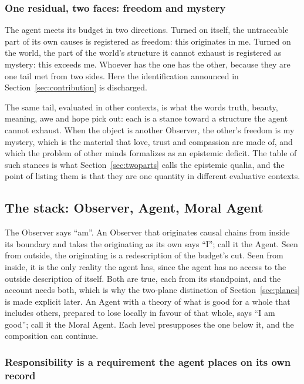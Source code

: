 \subsubsection{One residual, two faces: freedom and mystery}
\label{sec:twofaces}

The agent meets its budget in two directions. Turned on itself, the untraceable part of its own causes
is registered as freedom: this originates in me. Turned on the world, the part of the world's structure
it cannot exhaust is registered as mystery: this exceeds me. Whoever has the one has the other, because
they are one tail met from two sides. Here the identification announced in Section~\ref{sec:contribution}
is discharged.

The same tail, evaluated in other contexts, is what the words truth, beauty, meaning, awe and hope pick
out: each is a stance toward a structure the agent cannot exhaust. When the object is another Observer,
the other's freedom is my mystery, which is the material that love, trust and compassion are made of,
and which the problem of other minds formalizes as an epistemic deficit. The table of such stances is
what Section~\ref{sec:twoparts} calls the epistemic qualia, and the point of listing them is that they are one quantity in
different evaluative contexts.

\subsection{The stack: Observer, Agent, Moral Agent}
\label{sec:stack}

The Observer says ``am''. An Observer that originates causal chains from inside its boundary and takes
the originating as its own says ``I''; call it the Agent. Seen from outside, the originating is a
redescription of the budget's cut. Seen from inside, it is the only reality the agent has, since the
agent has no access to the outside description of itself. Both are true, each from its standpoint, and
the account needs both, which is why the two-plane distinction of Section~\ref{sec:planes} is made
explicit later. An Agent with a theory of what is good for a whole that includes others, prepared to
lose locally in favour of that whole, says ``I am good''; call it the Moral Agent. Each level
presupposes the one below it, and the composition can continue.

\subsubsection{Responsibility is a requirement the agent places on its own record}
\label{sec:responsibility}

